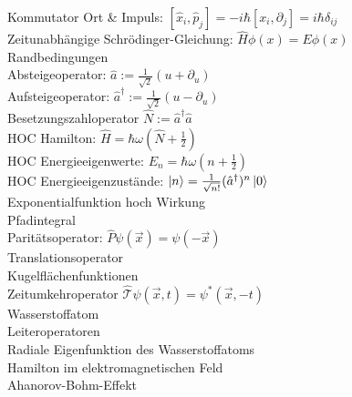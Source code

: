 \documentclass{article}
\begin{document}
Kommutator Ort \& Impuls: $[ \hat{x}_i, \hat{p}_j] = - i \hbar \left[x_i, \partial_j\right] = i \hbar \delta_{ij}$ \\

Zeitunabh\"angige Schr\"odinger-Gleichung: $\hat{H}\phi(x) = E \phi(x)$ \\

Randbedingungen \\

Absteigeoperator: $\hat{a} := \frac{1}{\sqrt{2}} (u + \partial_u)$ \\

Aufsteigeoperator: $\hat{a}^{\dagger} := \frac{1}{\sqrt{2}} (u - \partial_u)$ \\

Besetzungszahloperator $\hat{N} := \hat{a}^{\dagger} \hat{a} $ \\

HOC Hamilton: $ \hat{H} = \hbar \omega \left( \hat{N} + \frac{1}{2} \right) $ \\

HOC Energieeigenwerte: $ E_n = \hbar \omega \left( n + \frac{1}{2} \right)$\\

HOC Energieeigenzust\"ande: $\ket{n} = \frac{1}{\sqrt{n!}}(\hat{a}^{\dagger})^n \ket{0}$ \\

Exponentialfunktion hoch Wirkung \\

Pfadintegral \\

Parit\"atsoperator: $\hat{P}\psi(\vec{x}) = \psi(-\vec{x}) $ \\

Translationsoperator \\

Kugelfl\"achenfunktionen \\

Zeitumkehroperator $\hat{\mathcal{T}}\psi(\vec{x}, t) = \psi^*(\vec{x}, -t)$\\

Wasserstoffatom \\

Leiteroperatoren \\

Radiale Eigenfunktion des Wasserstoffatoms \\

Hamilton im elektromagnetischen Feld \\

Ahanorov-Bohm-Effekt \\
\end{document}
